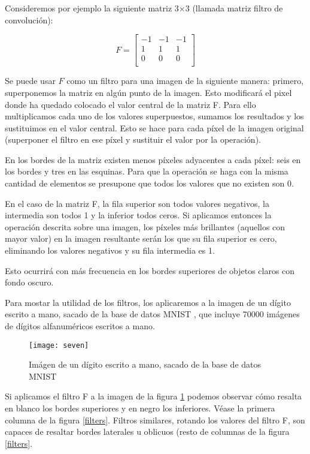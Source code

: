 Consideremos por ejemplo la siguiente matriz 3$\times$3 (llamada matriz filtro de convolución):

\[
  F=
  \left[ {\begin{array}{ccc}
   -1 & -1 & -1 \\
   1 & 1 & 1 \\
   0 & 0 & 0 \\
  \end{array} } \right]
\]

Se puede usar $F$ como un filtro para una imagen de la siguiente manera: primero, superponemos la matriz en algún punto de la imagen. Esto modificará el pixel donde ha quedado colocado el valor central de la matriz F. Para ello multiplicamos cada uno de los valores superpuestos, sumamos los resultados y los sustituimos en el valor central. Esto se hace para cada píxel de la imagen original (superponer el filtro en ese píxel y sustituir el valor por la operación).

En los bordes de la matriz existen menos píxeles adyacentes a cada píxel: seis en los bordes y tres en las esquinas. Para que la operación se haga con la misma cantidad de elementos se presupone que todos los valores que no existen son 0.

En el caso de la matriz F, la fila superior son todos valores negativos, la intermedia son todos 1 y la inferior todos ceros. Si aplicamos entonces la operación descrita sobre una imagen, los píxeles más brillantes (aquellos con mayor valor) en la imagen resultante serán los que su fila superior es cero, eliminando los valores negativos y su fila intermedia es 1. 

Esto ocurrirá con más frecuencia en los bordes superiores de objetos claros con fondo oscuro.

Para mostar la utilidad de los filtros, los aplicaremos a la imagen de un dígito escrito a mano, sacado de la base de datos MNIST \parencite{lecun-mnisthandwrittendigit-2010}, que incluye 70000 imágenes de dígitos alfanuméricos escritos a mano.

\begin{figure}
    \centering
    \caption{Imágen de un dígito escrito a mano, sacado de la base de datos MNIST}
  \label{seven}
  \texttt{[image: seven]}
\end{figure}

Si aplicamos el filtro F a la imagen de la figura \ref{seven} podemos observar cómo resalta en blanco los bordes superiores y en negro los inferiores. Véase la primera columna de la figura \ref{filters}. Filtros similares, rotando los valores del filtro F, son capaces de resaltar bordes laterales u oblicuos (resto de columnas de la figura \ref{filters}.

